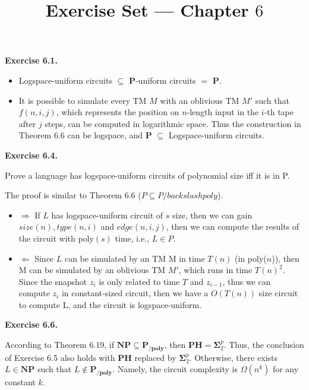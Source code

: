 \documentclass[a4paper]{article}
\title{Exercise Set --- Chapter $6$}
\date{}
\newenvironment{exercise}[1]{
	\par
	\noindent\textbf{Exercise #1.}\quad
}{
	\par
	\bigskip
}
\begin{document}
\maketitle

\begin{exercise}{6.1}
    \begin{itemize}
    \item Logspace-uniform circuits $\subseteq$ $\mathbf{P}$-uniform circuits $=$ $\mathbf{P}$.
    \item It is possible to simulate every TM $M$ with an oblivious TM $M'$ such that $f(n,i,j)$, which represents the position
        on $n$-length input in the $i$-th tape after $j$ steps, can be computed in logarithmic space.
            Thus the construction in Theorem 6.6 can be logspace, and $\mathbf{P}$ $\subseteq$ Logspace-uniform circuits.
    \end{itemize}
\end{exercise}

\begin{exercise}{6.4}
Prove a language has logspace-uniform circuits of polynomial size iff it is in P.

The proof is similar to Theorem 6.6 ($P \subseteq P/backslash poly$).

\begin{itemize}
\item $\Rightarrow$  If $L$ has logspace-uniform circuit of $s$ size, then we can gain $size(n), type(n,i)$ and $edge(n,i,j)$, then we can compute the results of the circuit with poly$(s)$ time, i.e., $L \in P$.

\item $\Leftarrow$ Since $L$ can be simulated by an TM M in time $T(n)$ (in poly($n$)), then M can be simulated by an oblivious TM $M'$, which runs in time $T(n)^{2}$. Since  the snapshot $z_{i}$ is only related to time $T$ and $z_{i-1}$, thus we can compute $z_{i}$ in constant-sized circuit, then we have a $O(T(n))$ size circuit to compute L, and the circuit is logspace-uniform.
\end{itemize}

\end{exercise}


\begin{exercise}{6.6}
    According to Theorem 6.19, if $\textbf{NP} \subseteq \textbf{P}_{\textbf{/poly}}$, then $\textbf{PH} = \mathbf{\Sigma}_2^p$. Thus, the conclusion of Exercise 6.5 also holds with $\mathbf{PH}$ replaced by $\mathbf{\Sigma}_2^p$. Otherwise, there exists $L \in \textbf{NP}$ such that $L \not\in \textbf{P}_{\textbf{/poly}}$. Namely, the circuit complexity is $\Omega(n^k)$ for any constant $k$.
\end{exercise}
\end{document}
